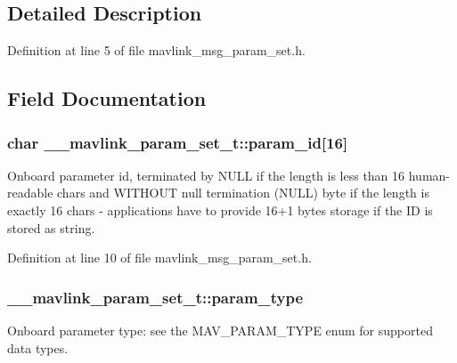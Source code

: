 \subsection{Detailed Description}


Definition at line 5 of file mavlink\-\_\-msg\-\_\-param\-\_\-set.\-h.



\subsection{Field Documentation}
\hypertarget{struct____mavlink__param__set__t_acfcba135c2e917f0fcf3527bf2354477}{
\subsubsection[{param\-\_\-id}]{\setlength{\rightskip}{0pt plus 5cm}char \-\_\-\-\_\-mavlink\-\_\-param\-\_\-set\-\_\-t\-::param\-\_\-id\mbox{[}16\mbox{]}}}\label{struct____mavlink__param__set__t_acfcba135c2e917f0fcf3527bf2354477}


Onboard parameter id, terminated by N\-U\-L\-L if the length is less than 16 human-\/readable chars and W\-I\-T\-H\-O\-U\-T null termination (N\-U\-L\-L) byte if the length is exactly 16 chars -\/ applications have to provide 16+1 bytes storage if the I\-D is stored as string. 



Definition at line 10 of file mavlink\-\_\-msg\-\_\-param\-\_\-set.\-h.

\hypertarget{struct____mavlink__param__set__t_a4eb99cce0725481254d653290a06de6f}{
\subsubsection[{param\-\_\-type}]{ \-\_\-\-\_\-mavlink\-\_\-param\-\_\-set\-\_\-t\-::param\-\_\-type}}\label{struct____mavlink__param__set__t_a4eb99cce0725481254d653290a06de6f}


Onboard parameter type\-: see the M\-A\-V\-\_\-\-P\-A\-R\-A\-M\-\_\-\-T\-Y\-P\-E enum for supported data types. 




